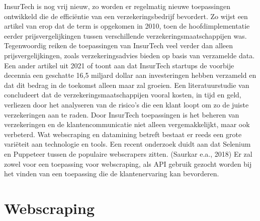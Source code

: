 InsurTech is nog vrij nieuw, zo worden er regelmatig nieuwe toepassingen ontwikkeld die de efficiëntie van een verzekeringsbedrijf bevordert. Zo wijst een artikel van \textcite{Institute2020} erop dat de term is opgekomen in 2010, toen de hoofdimplementatie eerder prijsvergelijkingen tussen verschillende verzekeringsmaatschappijen was. Tegenwoordig reiken de toepassingen van InsurTech veel verder dan alleen prijsvergelijkingen, zoals verzekeringsadvies bieden op basis van verzamelde data. Een ander artikel uit 2021 of \textcite{InsuranceCommissioners2021} toont aan dat InsurTech startups de voorbije decennia een geschatte 16,5 miljard dollar aan investeringen hebben verzameld en dat dit bedrag in de toekomst alleen maar zal groeien. Een literatuurstudie van \textcite{inproceedings} concludeert dat de verzekeringsmaatschappijen vooral kosten, in tijd en geld, verliezen door het analyseren van de risico’s die een klant loopt om zo de juiste verzekeringen aan te raden. Door InsurTech toepassingen is het beheren van verzekeringen en de klantencommunicatie niet alleen vergemakkelijkt, maar ook verbeterd. Wat webscraping en datamining betreft bestaat er reeds een grote variëteit aan technologie en tools. Een recent onderzoek duidt aan dat Selenium en Puppeteer tussen de populaire webscrapers zitten. (Saurkar e.a., 2018) Er zal zowel voor een toepassing voor webscraping, als API gebruik gezocht worden bij het vinden van een toepassing die de klantenervaring kan bevorderen.



\section{Webscraping}


